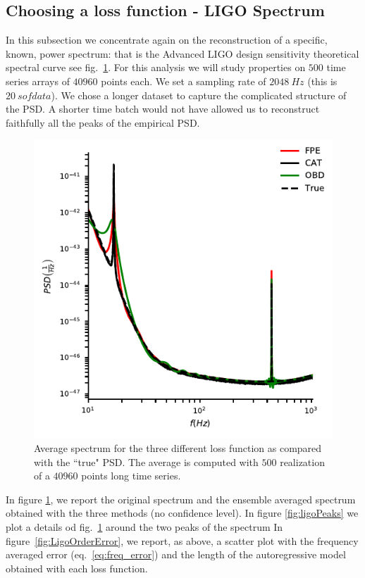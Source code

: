 \documentclass[twocolumn,showpacs,preprintnumbers,nofootinbib,prd,
superscriptaddress,10pt]{revtex4-1}
\begin{document}
\subsection{Choosing a loss function - LIGO Spectrum} \label{sec:LIGO_validation}
In this subsection we concentrate again on the reconstruction of a specific, known, power spectrum: that is the Advanced LIGO design sensitivity theoretical spectral curve see fig.~\ref{fig:ligospectrum}.
For this analysis we will study properties on $500$ time series arrays of $40960$ points each. We set a sampling rate of $\SI{2048}{Hz}$ (this is $\SI{20}{s} of data$).
We chose a longer dataset to capture the complicated structure of the PSD. A shorter time batch would not have allowed us to reconstruct faithfully all the peaks of the empirical PSD.


\begin{figure}
    \centering
     \includegraphics[width = \linewidth]{Images/optimisers_comparison/ligo/compare_estimates.pdf}
      \caption{Average spectrum for the three different loss function as compared with the ``true" PSD. The average is computed with $500$ realization of a $40960$ points long time series.}
       \label{fig:ligospectrum}
\end{figure}
In figure \ref{fig:ligospectrum}, we report the original spectrum and the ensemble averaged spectrum obtained with the three methods (no confidence level).
In figure \ref{fig:ligoPeaks} we plot a details od fig.~\ref{fig:ligospectrum} around the two peaks of the spectrum
In figure~\ref{fig:LigoOrderError}, we report, as above, a scatter plot with the frequency averaged error (eq.~\ref{eq:freq_error}) and the length of the autoregressive model obtained with each loss function.
\end{document}
